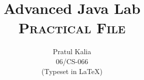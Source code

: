 \documentclass{report}
\title{{\Huge Advanced Java Lab}\\
\textsc{Practical File}}
\author{Pratul Kalia\\
06/CS-066\\
{\small (Typeset in \LaTeX{})}}
\date{}
\begin{document}
\maketitle
\renewcommand{\thesection}{\arabic{section}.}
\renewcommand{\thesubsection}{\arabic{section}.\arabic{subsection}}








\end{document}
